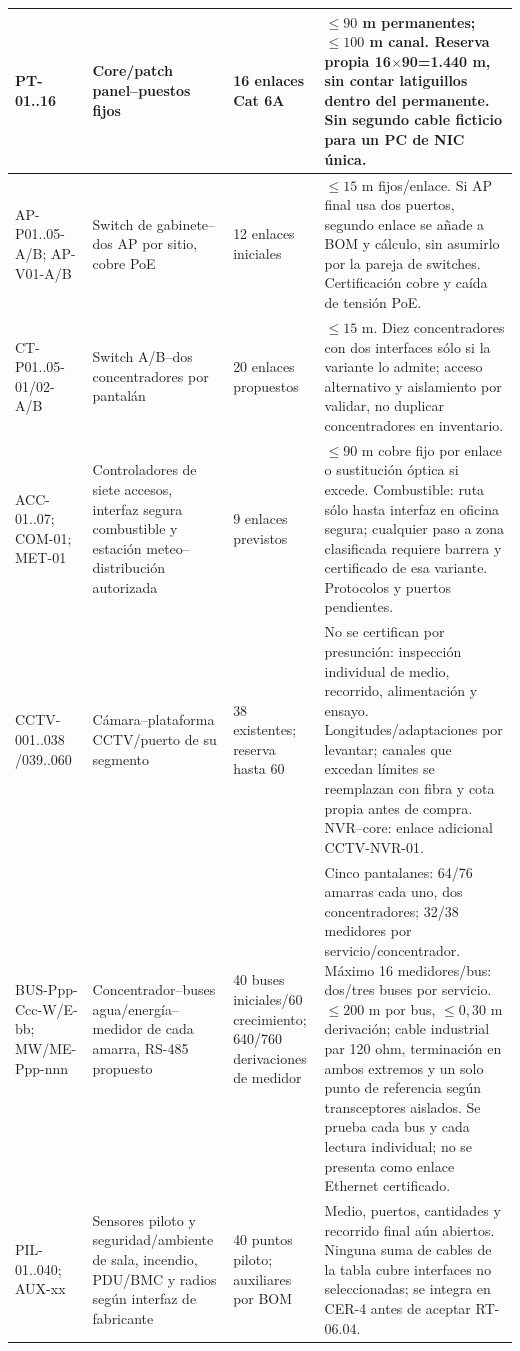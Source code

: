 \begin{paginaHorizontalSynaptix}
\begin{longtable}{L{\dimexpr.17\tabcolsep\relax}L{\dimexpr.29\tabcolsep\relax}L{\dimexpr.15\tabcolsep\relax}L{\dimexpr.39\tabcolsep\relax}}
PT-01..16 & Core/patch panel--puestos fijos & 16 enlaces Cat 6A & $\leq90$ m permanentes; $\leq100$ m canal. Reserva propia 16$\times$90=1.440 m, sin contar latiguillos dentro del permanente. Sin segundo cable ficticio para un PC de NIC única.\\\hline
AP-P01..05-A/B; AP-V01-A/B & Switch de gabinete--dos AP por sitio, cobre PoE & 12 enlaces iniciales & $\leq15$ m fijos/enlace. Si AP final usa dos puertos, segundo enlace se añade a BOM y cálculo, sin asumirlo por la pareja de switches. Certificación cobre y caída de tensión PoE.\\\hline
CT-P01..05-01/02-A/B & Switch A/B--dos concentradores por pantalán & 20 enlaces propuestos & $\leq15$ m. Diez concentradores con dos interfaces sólo si la variante lo admite; acceso alternativo y aislamiento por validar, no duplicar concentradores en inventario.\\\hline
ACC-01..07; COM-01; MET-01 & Controladores de siete accesos, interfaz segura combustible y estación meteo--distribución autorizada & 9 enlaces previstos & $\leq90$ m cobre fijo por enlace o sustitución óptica si excede. Combustible: ruta sólo hasta interfaz en oficina segura; cualquier paso a zona clasificada requiere barrera y certificado de esa variante. Protocolos y puertos pendientes.\\\hline
CCTV-001..038 /039..060 & Cámara--plataforma CCTV/puerto de su segmento & 38 existentes; reserva hasta 60 & No se certifican por presunción: inspección individual de medio, recorrido, alimentación y ensayo. Longitudes/adaptaciones por levantar; canales que excedan límites se reemplazan con fibra y cota propia antes de compra. NVR--core: enlace adicional CCTV-NVR-01.\\\hline
BUS-Ppp-Ccc-W/E-bb; MW/ME-Ppp-nnn & Concentrador--buses agua/energía--medidor de cada amarra, RS-485 propuesto & 40 buses iniciales/60 crecimiento; 640/760 derivaciones de medidor & Cinco pantalanes: 64/76 amarras cada uno, dos concentradores; 32/38 medidores por servicio/concentrador. Máximo 16 medidores/bus: dos/tres buses por servicio. $\leq200$ m por bus, $\leq0,30$ m derivación; cable industrial par 120 ohm, terminación en ambos extremos y un solo punto de referencia según transceptores aislados. Se prueba cada bus y cada lectura individual; no se presenta como enlace Ethernet certificado.\\\hline
PIL-01..040; AUX-xx & Sensores piloto y seguridad/ambiente de sala, incendio, PDU/BMC y radios según interfaz de fabricante & 40 puntos piloto; auxiliares por BOM & Medio, puertos, cantidades y recorrido final aún abiertos. Ninguna suma de cables de la tabla cubre interfaces no seleccionadas; se integra en CER-4 antes de aceptar RT-06.04.\\\hline

\end{longtable}
\end{paginaHorizontalSynaptix}
